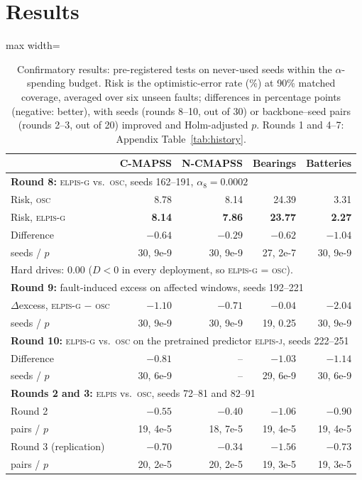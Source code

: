 \documentclass{esannV2}
\newcommand{\OSC}{\textsc{osc}}
\newcommand{\RPT}{\textsc{elpis}}
\newcommand{\AUTOD}{\textsc{elpis-g}}
\newcommand{\EJ}{\textsc{elpis-j}}
\begin{document}
\FloatBarrier
\section{Results}\label{sec:results}

\begin{table}[!htbp]
\caption{Confirmatory results: pre-registered tests on never-used seeds within the $\alpha$-spending budget. Risk is the optimistic-error rate (\%) at 90\% matched coverage, averaged over six unseen faults; differences in percentage points (negative: better), with seeds (rounds 8--10, out of 30) or backbone--seed pairs (rounds 2--3, out of 20) improved and Holm-adjusted $p$. Rounds 1 and 4--7: Appendix Table~\ref{tab:history}.}
\label{tab:confirm}
\centering\footnotesize
\setlength{\tabcolsep}{4pt}
\begin{adjustbox}{max width=\textwidth}\begin{tabular}{lrrrr}
\toprule
 & C-MAPSS & N-CMAPSS & Bearings & Batteries\\
\midrule
\multicolumn{5}{l}{\textbf{Round 8:} \AUTOD{} vs.\ \OSC, seeds 162--191, $\alpha_8=0.0002$}\\
Risk, \OSC & 8.78 & 8.14 & 24.39 & 3.31\\
Risk, \AUTOD & \textbf{8.14} & \textbf{7.86} & \textbf{23.77} & \textbf{2.27}\\
Difference & $-0.64$ & $-0.29$ & $-0.62$ & $-1.04$\\
\quad seeds / $p$ & 30, 9e-9 & 30, 9e-9 & 27, 2e-7 & 30, 9e-9\\
\multicolumn{5}{l}{\quad Hard drives: $0.00$ ($D<0$ in every deployment, so \AUTOD{} = \OSC).}\\
\midrule
\multicolumn{5}{l}{\textbf{Round 9:} fault-induced excess on affected windows, seeds 192--221}\\
$\Delta$excess, \AUTOD{} $-$ \OSC & $-1.10$ & $-0.71$ & $-0.04$ & $-2.04$\\
\quad seeds / $p$ & 30, 9e-9 & 30, 9e-9 & 19, 0.25 & 30, 9e-9\\
\midrule
\multicolumn{5}{l}{\textbf{Round 10:} \AUTOD{} vs.\ \OSC{} on the pretrained predictor \EJ, seeds 222--251}\\
Difference & $-0.81$ & -- & $-1.03$ & $-1.14$\\
\quad seeds / $p$ & 30, 6e-9 & -- & 29, 6e-9 & 30, 6e-9\\
\midrule
\multicolumn{5}{l}{\textbf{Rounds 2 and 3:} \RPT{} vs.\ \OSC, seeds 72--81 and 82--91}\\
Round 2 & $-0.55$ & $-0.40$ & $-1.06$ & $-0.90$\\
\quad pairs / $p$ & 19, 4e-5 & 18, 7e-5 & 19, 4e-5 & 19, 4e-5\\
Round 3 (replication) & $-0.70$ & $-0.34$ & $-1.56$ & $-0.73$\\
\quad pairs / $p$ & 20, 2e-5 & 20, 2e-5 & 19, 3e-5 & 19, 3e-5\\
\bottomrule
\end{tabular}\end{adjustbox}
\end{table}
\end{document}

